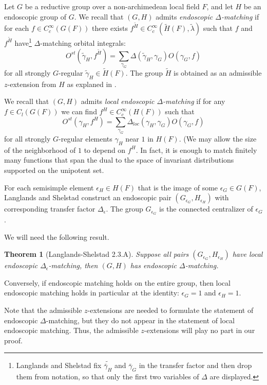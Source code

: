 \documentclass[12pt]{amsart}
\theoremstyle{plain}
\newtheorem{theorem}[thm]{Theorem}
\theoremstyle{definition}
\begin{document}
Let $G$ be a reductive group over a non-archimedean local field $F$,
and let $H$ be an endoscopic group of $G$.    We recall \cite[Sec.2.1]{LSd} that $(G,H)$
admits {\it endoscopic $\Delta$-matching} if for each $f\in
C_c^\infty(G(F))$ there exists $f^{\tilde H}\in C_c^\infty(\tilde
H(F),\tilde \lambda)$ such that $f$ and $f^{\tilde H}$
have\footnote{Langlands and Shelstad fix $\tilde{\bar \gamma_H}$ and
  $\bar\gamma_G$ in the transfer factor and then drop them from
  notation, so that only the first two variables of $\Delta$ are displayed.}
$\Delta$-matching orbital integrals:
\[
O^{st}(\tilde \gamma_H,f^{\tilde H}) 
 = \sum_{\gamma_G} \Delta(\tilde\gamma_H,\gamma_G)O(\gamma_G,f)
\]
for all strongly $G$-regular $\tilde \gamma_H \in \tilde H(F)$.
The group $\tilde H$ is obtained as an admissible $z$-extension from
$H$ as explaned in \cite[Sec. 4.4]{LSxf}.

We recall that $(G,H)$ admits {\it local endoscopic $\Delta$-matching}
if for any $f\in C_l(G(F))$ we can find $f^H \in C_c^\infty(H(F))$
such that
\[
O^{st}( \gamma_H,f^{ H}) 
 = \sum_{\gamma_G} \Delta_{loc}(\gamma_H,\gamma_G)O(\gamma_G,f)
\]
for all strongly $G$-regular elements $\gamma_H$ near $1$ in $H(F)$.
(We may allow the size of the neighborhood of $1$ to depend on $f^H$.
In fact, it is enough to match finitely many functions that span the
dual to the space of invariant distributions supported on the
unipotent set.

For each semisimple element $\epsilon_H \in H(F)$ that is the image of
some $\epsilon_G\in G(F)$, Langlands and Shelstad construct an
endoscopic pair $(G_{\epsilon_G},H_{\epsilon_H})$ with corresponding
transfer factor $\Delta_\epsilon$.  The group $G_{\epsilon_G}$ is the
connected centralizer of $\epsilon_G$.

We will need the following result.

\begin{theorem}[Langlands-Shelstad 2.3.A]  Suppose all pairs
  $(G_{\epsilon_G},H_{\epsilon_H})$ have local endoscopic
  $\Delta_\epsilon$-matching, then $(G,H)$ has endoscopic $\Delta$-matching.
\end{theorem}

Conversely, if endoscopic matching holds on the entire group, then
local endoscopic matching holds in particular at the identity:
$\epsilon_G = 1$ and $\epsilon_H =1$.

Note that the admissible $z$-extensions are needed to formulate the
statement of endoscopic $\Delta$-matching, but they do not appear in
the statement of local endoscopic matching.  Thus, the admissible
$z$-extensions will play no part in our proof.
\end{document}
